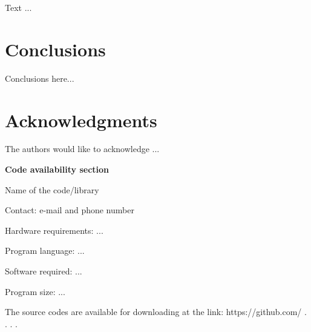 \documentclass[a4paper,fleqn]{cas-sc}
\begin{document}
Text ...

\section{Conclusions}

Conclusions here...

\section{Acknowledgments}

The authors would like to acknowledge ...

\newpage

\textbf{Code availability section}

Name of the code/library

Contact: e-mail and phone number

Hardware requirements: ...

Program language: ...
 
Software required: ...

Program size: ...

The source codes are available for downloading at the link:
https://github.com/ . . . . 



 
\end{document}
